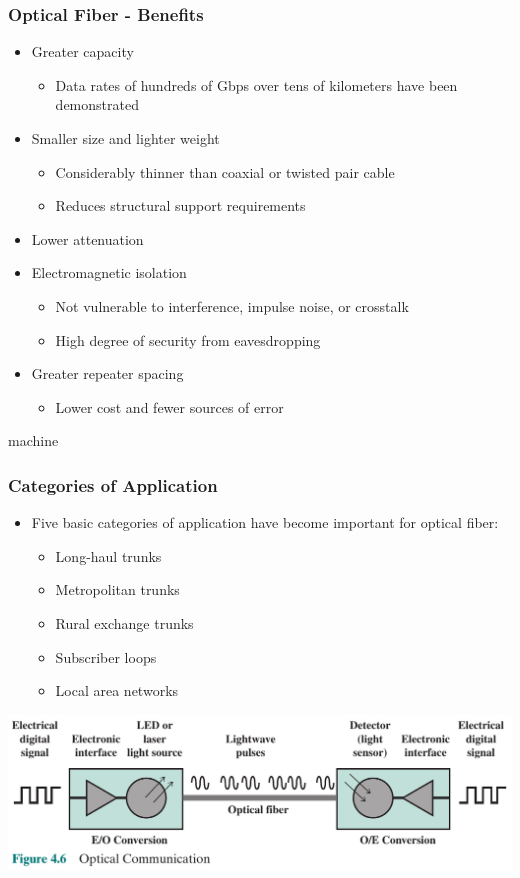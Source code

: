 \documentclass[pdflatex,compress]{beamer}
\begin{document}
\begin{frame}
	\frametitle{Optical Fiber - Benefits}
	\begin{itemize}
		\item Greater capacity
		\begin{itemize}
			\item Data rates of hundreds of Gbps over tens of kilometers have been demonstrated
		\end{itemize}
		\item Smaller size and lighter weight
		\begin{itemize}
			\item Considerably thinner than coaxial or twisted pair cable
			\item Reduces structural support requirements
		\end{itemize}
		\item Lower attenuation
		\item Electromagnetic isolation
		\begin{itemize}
			\item Not vulnerable to interference, impulse noise, or crosstalk
			\item High degree of security from eavesdropping
		\end{itemize}
		\item Greater repeater spacing
		\begin{itemize}
			\item Lower cost and fewer sources of error
		\end{itemize}
	\end{itemize}
\end{frame}
machine 
\begin{frame}
	\frametitle{Categories of Application}
	\begin{itemize}
		\item Five basic categories of application have become important for optical fiber:
		\begin{itemize}
			\item Long-haul trunks
			\item Metropolitan trunks
			\item Rural exchange trunks
			\item Subscriber loops
			\item Local area networks
		\end{itemize}
	\end{itemize}
\end{frame}

\begin{frame}
	\begin{center}
		\includegraphics[width=\linewidth]{img/img14}
	\end{center}
\end{frame}
\end{document}

